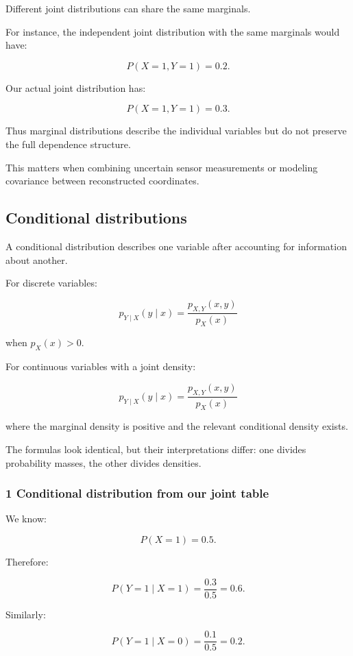 Different joint distributions can share the same marginals.

For instance, the independent joint distribution with the same marginals would have:

\[
 P(X=1,Y=1)=0.2.
\]

Our actual joint distribution has:

\[
 P(X=1,Y=1)=0.3.
\]

Thus marginal distributions describe the individual variables but do not preserve the full dependence structure.

This matters when combining uncertain sensor measurements or modeling covariance between reconstructed coordinates.

\subsection{Conditional distributions}\label{02-foundations-ii-ch023-conditional-distributions}

A conditional distribution describes one variable after accounting for information about another.

For discrete variables:

\[
 \boxed{ p_{Y\mid X}(y\mid x) = \frac{p_{X,Y}(x,y)}{p_X(x)} }
\]

when \(p_X(x)>0\).

For continuous variables with a joint density:

\[
 \boxed{ p_{Y\mid X}(y\mid x) = \frac{p_{X,Y}(x,y)}{p_X(x)} }
\]

where the marginal density is positive and the relevant conditional density exists.

The formulas look identical, but their interpretations differ: one divides probability masses, the other divides densities.

\subsubsection{1 Conditional distribution from our joint table}\label{02-foundations-ii-ch023-conditional-distribution-from-our-joint-table}

We know:

\[
 P(X=1)=0.5.
\]

Therefore:

\[
 P(Y=1\mid X=1) = \frac{0.3}{0.5} =\boxed{0.6}.
\]

Similarly:

\[
 P(Y=1\mid X=0) = \frac{0.1}{0.5} =\boxed{0.2}.
\]


